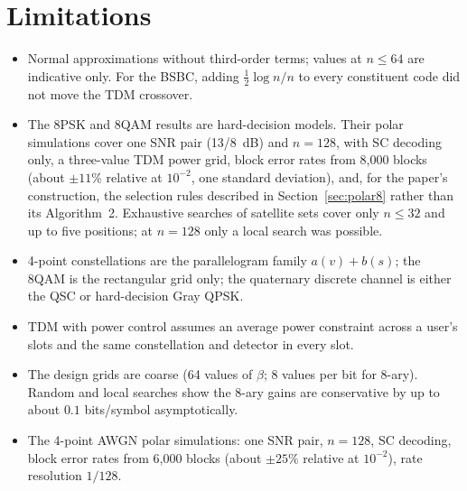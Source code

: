 \documentclass[11pt]{article}
\begin{document}
\section{Limitations}
\begin{itemize}
\item Normal approximations without third-order terms; values at $n\le64$ are indicative only. For the BSBC, adding $\frac12\log n/n$ to every constituent code did not move the TDM crossover.
\item The 8PSK and 8QAM results are hard-decision models. Their polar simulations cover one SNR pair (13/8~dB) and $n=128$, with SC decoding only, a three-value TDM power grid, block error rates from 8{,}000 blocks (about $\pm11\%$ relative at $10^{-2}$, one standard deviation), and, for the paper's construction, the selection rules described in Section~\ref{sec:polar8} rather than its Algorithm~2. Exhaustive searches of satellite sets cover only $n\le32$ and up to five positions; at $n=128$ only a local search was possible.
\item 4-point constellations are the parallelogram family $a(v)+b(s)$; the 8QAM is the rectangular grid only; the quaternary discrete channel is either the QSC or hard-decision Gray QPSK.
\item TDM with power control assumes an average power constraint across a user's slots and the same constellation and detector in every slot.
\item The design grids are coarse (64 values of $\beta$; 8 values per bit for 8-ary). Random and local searches show the 8-ary gains are conservative by up to about $0.1$ bits/symbol asymptotically.
\item The 4-point AWGN polar simulations: one SNR pair, $n=128$, SC decoding, block error rates from 6{,}000 blocks (about $\pm25\%$ relative at $10^{-2}$), rate resolution $1/128$.
\end{itemize}
\end{document}
